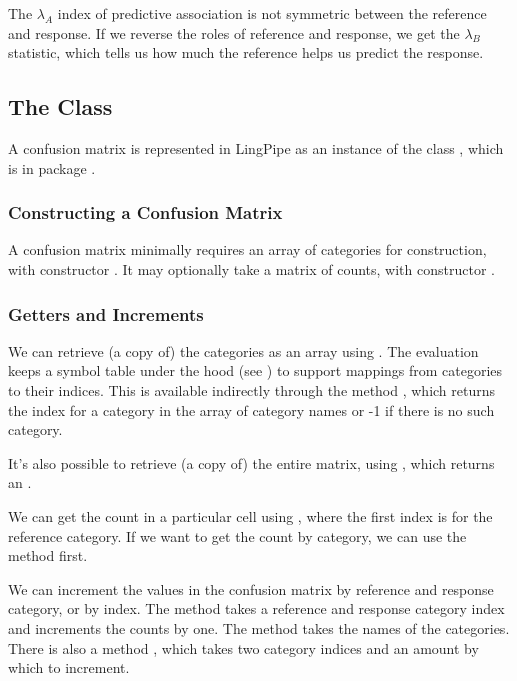The $\lambda_A$ index of predictive association is not symmetric
between the reference and response.  If we reverse the roles of
reference and response, we get the $\lambda_B$ statistic, which tells
us how much the reference helps us predict the response.


\subsection{The  Class}

A confusion matrix is represented in LingPipe as an instance of the
class , which is in package
.  

\subsubsection{Constructing a Confusion Matrix}

A confusion matrix minimally requires an array of categories for
construction, with constructor .  It
may optionally take a matrix of counts, with constructor
.

\subsubsection{Getters and Increments}

We can retrieve (a copy of) the categories as an array using
.  The evaluation keeps a symbol table under the
hood (see ) to support mappings from categories
to their indices.  This is available indirectly through the method
, which returns the index for a category in the
array of category names or -1 if there is no such category.

It's also possible to retrieve (a copy of) the entire matrix, using
, which returns an .  

We can get the count in a particular cell using ,
where the first index is for the reference category.  If we want to
get the count by category, we can use the  method
first.

We can increment the values in the confusion matrix by reference and
response category, or by index.  The method 
takes a reference and response category index and increments the
counts by one.  The method  takes
the names of the categories.  There is also a method
, which takes two category indices
and an amount by which to increment.

